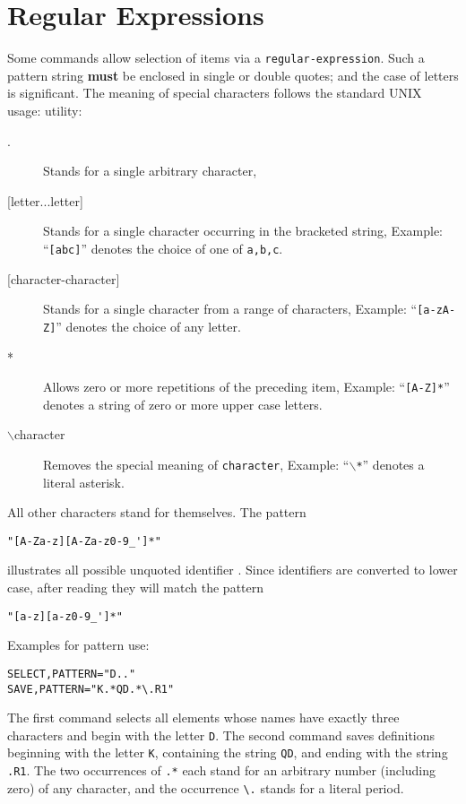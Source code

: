 \section{Regular Expressions}
\label{sec:wildcard}
Some commands allow selection of items via a \texttt{regular-expression}.
Such a pattern string \textbf{must} be enclosed in single or double quotes;
and the case of letters is significant.
The meaning of special characters follows the standard UNIX usage:
utility:
\begin{description}
\item[.]
Stands for a single arbitrary character,
\item[{[letter...letter]}]
Stands for a single character occurring in the bracketed string,
\noindent Example: ``\texttt{[abc]}'' denotes the choice of one of
\texttt{a,b,c}. 
\item[{[character-character]}]
Stands for a single character from a range of characters,
\noindent Example: ``\texttt{[a-zA-Z]}'' denotes the choice of any letter.
\item[*]
Allows zero or more repetitions of the preceding item,
\noindent Example: ``\texttt{[A-Z]*}'' denotes a string of zero or more
upper case letters. 
\item[$\backslash$character]
Removes the special meaning of \texttt{character},
\noindent Example: ``\texttt{$\backslash$*}'' denotes a literal asterisk.
\end{description}
All other characters stand for themselves.
The pattern
\begin{verbatim}
"[A-Za-z][A-Za-z0-9_']*"
\end{verbatim}
illustrates all possible unquoted identifier .
Since identifiers are converted to lower case, 
after reading they will match the pattern
\begin{verbatim}
"[a-z][a-z0-9_']*"
\end{verbatim}
\noindent Examples for pattern use:
\begin{verbatim}
SELECT,PATTERN="D.." 
SAVE,PATTERN="K.*QD.*\.R1"
\end{verbatim}
The first command selects all elements whose names have exactly three
characters and begin with the letter \texttt{D}.
The second command saves definitions beginning with the letter \texttt{K},
containing the string \texttt{QD}, and ending with the string \texttt{.R1}.
The two occurrences of \verb'.*' each stand for an arbitrary
number (including zero) of any character,
and the occurrence \verb'\.' stands for a literal period.

